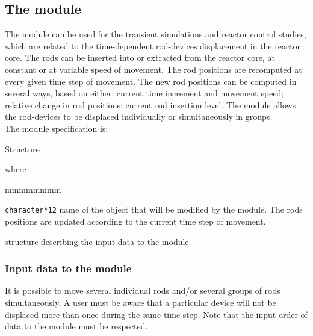 \subsection{The  module}\label{sect:movdev}

\vskip 0.2cm
The  module can be used for the transient simulations and
reactor control studies, which are related to the time-dependent rod-devices
displacement in the reactor core. The rods can be inserted into or extracted
from the reactor core, at constant or at variable speed of movement. The rod
positions are recomputed at every given time step of movement. The new rod
positions can be computed in several ways, based on either: current time increment
and movement speed; relative change in rod positions;  current rod
insertion level. The  module allows the rod-devices to be
displaced individually or simultaneously in groups.\\

\noindent
The  module specification is:

\begin{DataStructure}{Structure }
 \moc{:=} 
 \moc{::} 
\end{DataStructure}

\noindent where

\begin{ListeDeDescription}{mmmmmmmm}

\item[\dusa{DEVICE}] \texttt{character*12} name of the 
object that will be modified by the module. The rods positions are updated
according to the current time step of movement.

\item[\dstr{descmove}] structure describing the input data to the
 module.

\end{ListeDeDescription}

\vskip 0.2cm

\subsubsection{Input data to the  module}\label{sect:movdevstr}

It is possible to move several individual rods and/or several groups of rods
simultaneously. A user must be aware that a particular device will not be displaced
more than once during the same time step. Note that the input order of data to the
module must be respected. 

